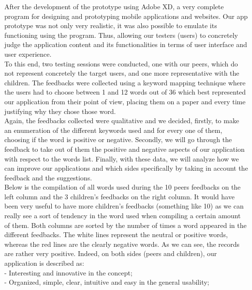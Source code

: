 \documentclass[12pt]{scrartcl}
\begin{document}
	After the development of the prototype using Adobe XD, a very complete program for designing and prototyping mobile applications and websites. Our app prototype was not only very realistic, it was also possible to emulate its functioning using the program. Thus, allowing our testers (users) to concretely judge the application content and its functionalities in terms of user interface and user experience. \\

	To this end, two testing sessions were conducted, one with our peers, which do not represent concretely the target users, and one more representative with the children. The feedbacks were collected using a keyword mapping technique where the users had to choose between 1 and 12 words out of 36 which best represented our application from their point of view, placing them on a paper and every time justifying why they chose those word.\\

	Again, the feedbacks collected were qualitative and we decided, firstly, to make an enumeration of the different keywords used and for every one of them, choosing if the word is positive or negative. Secondly, we will go through the feedback to take out of them the positive and negative aspects of our application with respect to the words list. Finally, with these data, we will analyze how we can improve our applications and which sides specifically by taking in account the feedback and the suggestions.\\

	Below is the compilation of all words used during the 10 peers feedbacks on the left column and the 3 children’s feedbacks on the right column. It would have been very useful to have more children’s feedbacks (something like 10) as we can really see a sort of tendency in the word used when compiling a certain amount of them. Both columns are sorted by the number of times a word appeared in the different feedbacks. The white lines represent the neutral or positive words, whereas the red lines are the clearly negative words. As we can see, the records are rather very positive. Indeed, on both sides (peers and children), our application is described as:\\
	
		- Interesting and innovative in the concept;\\
		
		- Organized, simple, clear, intuitive and easy in the general usability;\\
		
\end{document}
